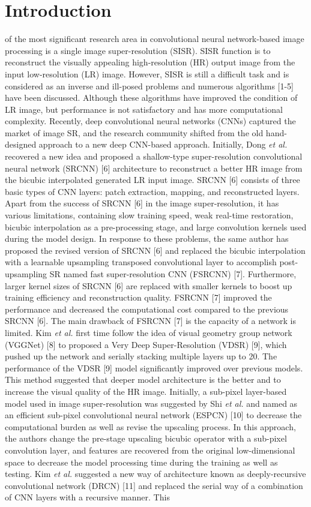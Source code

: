 \documentclass{ieeeaccess}
\begin{document}
\section{Introduction}
\label{sec:introduction}
 of the most significant research area in convolutional neural network-based image processing is a single image super-resolution (SISR). SISR function is to reconstruct the visually appealing high-resolution (HR) output image from the input low-resolution (LR) image.  However, SISR is still a difficult task and is considered as an inverse and ill-posed problems and numerous algorithms [1-5] have been discussed. Although these algorithms have improved the condition of LR image, but performance is not satisfactory and has more computational complexity. Recently, deep convolutional neural networks (CNNs) captured the market of image SR, and the research community shifted from the old hand-designed approach to a new deep CNN-based approach. Initially, Dong \textit{et al.} recovered a new idea and proposed a shallow-type super-resolution convolutional neural network (SRCNN) [6] architecture to reconstruct a better HR image from the bicubic interpolated generated LR input image. SRCNN [6] consists of three basic types of CNN layers: patch extraction, mapping, and reconstructed layers. Apart from the success of SRCNN [6] in the image super-resolution, it has various limitations, containing slow training speed, weak real-time restoration, bicubic interpolation as a pre-processing stage, and large convolution kernels used during the model design. In response to these problems, the same author has proposed the revised version of SRCNN [6] and replaced the bicubic interpolation with a learnable upsampling transposed convolutional layer to accomplish post-upsampling SR named  fast super-resolution CNN (FSRCNN) [7]. Furthermore, larger kernel sizes of SRCNN [6] are replaced with smaller kernels to boost up training efficiency and reconstruction quality. FSRCNN [7] improved the performance and decreased the computational cost compared to the previous SRCNN [6]. The main drawback of FSRCNN [7] is the capacity of a network is limited. Kim \textit{et al.} first time follow the idea of  visual geometry group network (VGGNet) [8] to proposed a Very Deep Super-Resolution (VDSR) [9], which pushed up the network and serially stacking multiple layers up to 20. The performance of the VDSR [9] model significantly improved over previous models. This method suggested that deeper model architecture is the better and to increase the visual quality of the HR image. Initially, a sub-pixel layer-based model used in image super-resolution was suggested by Shi \textit{et al.} and named as an efficient sub-pixel convolutional neural network (ESPCN) [10] to decrease the computational burden as well as revise the upscaling process. In this approach, the authors change the pre-stage upscaling bicubic operator with a sub-pixel convolution layer, and features are recovered from the original low-dimensional space to decrease the model processing time during the training as well as testing. Kim \textit{et al.} suggested a new way of architecture known as deeply-recursive convolutional network (DRCN) [11]  and replaced the serial way of a combination of CNN layers with a recursive manner. This 
\end{document}
